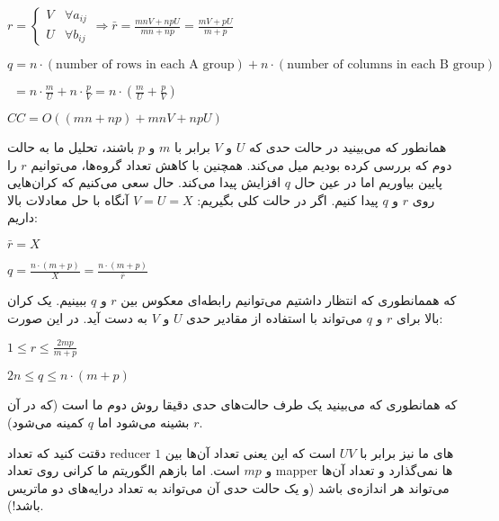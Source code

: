 \documentclass[a4paper,12pt]{article}
\begin{document}
\begin{latin}
$r = \begin{cases}
	V & \forall a_{ij} \\
	U & \forall b_{ij}
\end{cases} \Rightarrow \bar{r} = \frac{mnV + npU}{mn + np} = \frac{mV + pU}{m+p}$


$q =  n \cdot (\text{number of rows in each A group}) + n \cdot (\text{number of columns in each B group}) $ 

$\ \  = n \cdot \frac{m}{U} + n \cdot \frac{p}{V} = n \cdot (\frac{m}{U} + \frac{p}{V})$

$CC = O((mn + np) + mnV + npU)$


\end{latin}
همانطور که می‌بینید در حالت حدی که 
$U$
و
$V$
برابر با 
$m$
و
$p$
باشند، تحلیل ما به حالت دوم که بررسی کرده بودیم میل می‌کند. همچنین با کاهش تعداد گروه‌ها، می‌توانیم
$r$
را پایین بیاوریم اما در عین حال
$q$
افزایش پیدا می‌کند. حال سعی می‌کنیم که کران‌هایی روی 
$r$
و
$q$
پیدا کنیم. اگر در حالت کلی بگیریم:
$V = U = X$
آنگاه با حل معادلات بالا داریم: 
\begin{latin}
$\bar{r} = X$

$q = \frac{n \cdot (m+p)}{X} = \frac{n \cdot (m+p)}{\bar{r}}$ 
\end{latin}
که هممانطوری که انتظار داشتیم می‌توانیم رابطه‌ای معکوس بین 
$r$
و
$q$
ببینیم. یک کران بالا برای
$r$
و 
$q$
می‌تواند با استفاده از مقادیر حدی
$U$
و
$V$
به دست آید. در این صورت:
\begin{latin}
$1 \leq r \leq \frac{2mp}{m+p}$

$2n \leq q \leq n \cdot (m + p)$
\end{latin}

که همانطوری که می‌بینید یک طرف حالت‌های حدی دقیقا روش دوم ما است (که در آن
$r$
بشینه می‌شود اما
$q$
کمینه می‌شود).

دقتت کنید که تعداد 
reducer
های ما نیز برابر با
$UV$
است که این یعنی تعداد آن‌ها بین 
$1$
و
$mp$
است. اما بازهم الگوریتم ما کرانی روی تعداد
mapper
ها نمی‌گذارد و تعداد آن‌ها می‌تواند هر اندازه‌ی باشد (و یک حالت حدی آن می‌تواند به تعداد درایه‌های دو ماتریس باشد!). 
\end{document}
